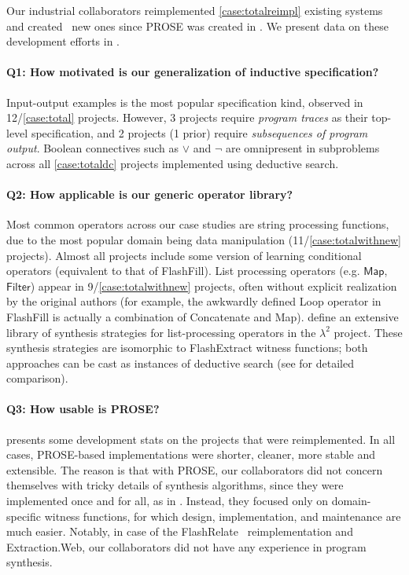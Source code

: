 Our industrial collaborators reimplemented \ref*{case:totalreimpl} existing systems
and created \pgfmathresult~new ones since
PROSE was created in \citeyear{flashmeta}.
We present data on these development efforts in .

\paragraph{Q1: How motivated is our generalization of inductive specification?}
Input-output examples is the most popular specification kind, observed in 12/\ref*{case:total} projects.
However, 3 projects require \emph{program traces} as their top-level specification, and 2 projects (1 prior) require
\emph{subsequences of program output}.
Boolean connectives such as $\vee$ and $\neg$ are omnipresent in subproblems across all \ref*{case:totaldc} projects
implemented using deductive search.

\paragraph{Q2: How applicable is our generic operator library?}
Most common operators across our case studies are string processing functions, due to the most popular domain being data
manipulation (11/\ref*{case:totalwithnew} projects).
Almost all projects include some version of learning conditional operators (equivalent to that of FlashFill).
List processing operators (e.g. $\mathsf{Map}$, $\mathsf{Filter}$) appear in 9/\ref*{case:totalwithnew} projects, often
without explicit realization by the original authors (for example, the awkwardly defined \textsf{Loop} operator in
FlashFill is actually a combination of \textsf{Concatenate} and \textsf{Map}).
\citet{pldi15:swarat} define an extensive library of synthesis strategies for list-processing operators in the
$\lambda^2$ project.
These synthesis strategies are isomorphic to FlashExtract witness functions; both approaches can be cast as instances of
deductive search (see  for detailed comparison).

\paragraph{Q3: How usable is PROSE?}
 presents some development stats on the projects that were reimplemented.
In all cases, PROSE-based implementations were shorter, cleaner, more stable and extensible.
The reason is that with PROSE, our collaborators did not concern themselves with tricky details of synthesis
algorithms, since they were implemented once and for all, as in .
Instead, they focused only on domain-specific witness functions, for which design, implementation, and maintenance are
much easier.
Notably, in case of the FlashRelate~\cite{flashrelate} reimplementation and \textsf{Extraction.Web}, our collaborators
did not have any experience in program synthesis.

